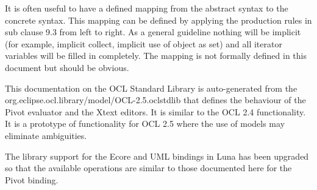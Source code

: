 \documentclass{scrreprt}   %
\begin{document}
It is often useful to have a defined mapping from the abstract syntax to the concrete syntax. This mapping can be defined
by applying the production rules in sub clause 9.3 from left to right. As a general guideline nothing will be implicit (for
example, implicit collect, implicit use of object as set) and all iterator variables will be filled in completely. The mapping
is not formally defined in this document but should be obvious.

\label{ocl:EvaluationSemantics}


This documentation on the OCL Standard Library is auto-generated from the
org.eclipse.ocl.library/model/OCL-2.5.oclstdlib that defines
the behaviour of the Pivot evaluator and the Xtext editors. It is similar to the OCL 2.4 functionality.
It is a prototype of functionality for OCL 2.5 where the use of models may eliminate ambiguities.
		
The library support for the Ecore and UML bindings in Luna has been upgraded so that the available operations
are similar to those documented here for the Pivot binding.





\end{document}

